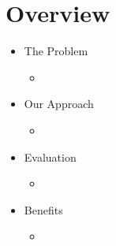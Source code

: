 \section*{Overview}

\begin{frame}
    \citet[VLDB][]{gates2009building}
\begin{itemize}
  \item The Problem
  \begin{itemize}
    \item %
  \end{itemize}

  \item Our Approach
  \begin{itemize}
    \item %
  \end{itemize}

  \item Evaluation
  \begin{itemize}
    \item %
  \end{itemize}

  \item Benefits
  \begin{itemize}
    \item %
  \end{itemize}
\end{itemize}
\end{frame}
